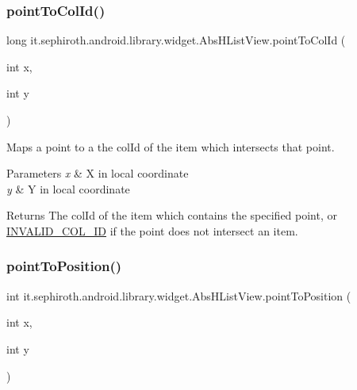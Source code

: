 \subsubsection{\texorpdfstring{point\+To\+Col\+Id()}{pointToColId()}}
{\footnotesize\ttfamily long it.\+sephiroth.\+android.\+library.\+widget.\+Abs\+H\+List\+View.\+point\+To\+Col\+Id (\begin{DoxyParamCaption}\item[{int}]{x,  }\item[{int}]{y }\end{DoxyParamCaption})}

Maps a point to a the col\+Id of the item which intersects that point.


\begin{DoxyParams}{Parameters}
{\em x} & X in local coordinate \\
\hline
{\em y} & Y in local coordinate \\
\hline
\end{DoxyParams}
\begin{DoxyReturn}{Returns}
The col\+Id of the item which contains the specified point, or \hyperlink{classit_1_1sephiroth_1_1android_1_1library_1_1widget_1_1_adapter_view_a4652ef84c3de9de7d3697a29e2bb96c6}{I\+N\+V\+A\+L\+I\+D\+\_\+\+C\+O\+L\+\_\+\+ID} if the point does not intersect an item. 
\end{DoxyReturn}
\mbox{\label{classit_1_1sephiroth_1_1android_1_1library_1_1widget_1_1_abs_h_list_view_a8430a7a76176d02b946bd2d996c3e426}} 
\subsubsection{\texorpdfstring{point\+To\+Position()}{pointToPosition()}}
{\footnotesize\ttfamily int it.\+sephiroth.\+android.\+library.\+widget.\+Abs\+H\+List\+View.\+point\+To\+Position (\begin{DoxyParamCaption}\item[{int}]{x,  }\item[{int}]{y }\end{DoxyParamCaption})}


